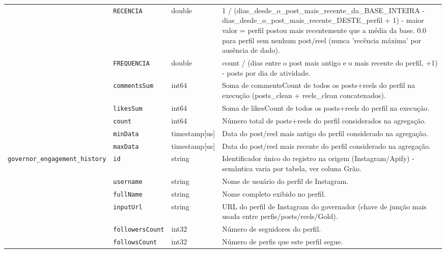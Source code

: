 \begin{footnotesize}
\begin{longtable}{p{3.2cm}p{3.0cm}p{2.0cm}p{6.0cm}}
\texttt{} & \texttt{RECENCIA} & double & 1 /\allowbreak{} (dias\_\allowbreak{}desde\_\allowbreak{}o\_\allowbreak{}post\_\allowbreak{}mais\_\allowbreak{}recente\_\allowbreak{}da\_\allowbreak{}BASE\_\allowbreak{}INTEIRA - dias\_\allowbreak{}desde\_\allowbreak{}o\_\allowbreak{}post\_\allowbreak{}mais\_\allowbreak{}recente\_\allowbreak{}DESTE\_\allowbreak{}perfil + 1) - maior valor = perfil postou mais recentemente que a média da base. 0.0 para perfil sem nenhum post/\allowbreak{}reel (nunca 'recência máxima' por ausência de dado). \\
\texttt{} & \texttt{FREQUENCIA} & double & count /\allowbreak{} (dias entre o post mais antigo e o mais recente do perfil, +1) - posts por dia de atividade. \\
\texttt{} & \texttt{commentsSum} & int64 & Soma de commentsCount de todos os posts+reels do perfil na execução (posts\_\allowbreak{}clean + reels\_\allowbreak{}clean concatenados). \\
\texttt{} & \texttt{likesSum} & int64 & Soma de likesCount de todos os posts+reels do perfil na execução. \\
\texttt{} & \texttt{count} & int64 & Número total de posts+reels do perfil considerados na agregação. \\
\texttt{} & \texttt{minData} & timestamp[us] & Data do post/\allowbreak{}reel mais antigo do perfil considerado na agregação. \\
\texttt{} & \texttt{maxData} & timestamp[us] & Data do post/\allowbreak{}reel mais recente do perfil considerado na agregação. \\
\texttt{governor\_\allowbreak{}engagement\_\allowbreak{}history} & \texttt{id} & string & Identificador único do registro na origem (Instagram/\allowbreak{}Apify) - semântica varia por tabela, ver coluna Grão. \\
\texttt{} & \texttt{username} & string & Nome de usuário do perfil de Instagram. \\
\texttt{} & \texttt{fullName} & string & Nome completo exibido no perfil. \\
\texttt{} & \texttt{inputUrl} & string & URL do perfil de Instagram do governador (chave de junção mais usada entre perfis/\allowbreak{}posts/\allowbreak{}reels/\allowbreak{}Gold). \\
\texttt{} & \texttt{followersCount} & int32 & Número de seguidores do perfil. \\
\texttt{} & \texttt{followsCount} & int32 & Número de perfis que este perfil segue. \\

\end{longtable}
\end{footnotesize}
